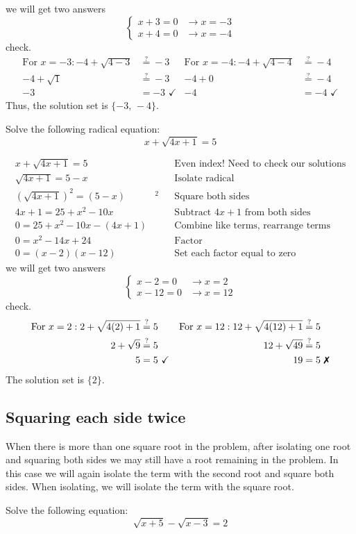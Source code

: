 		we will get two answers
	\[ \begin{cases}
		x+3=0  & \rightarrow x=-3 \\
		x+4=0  & \rightarrow x=-4
	\end{cases} \]
	check.
	\begin{align*}
		\text{For}\,\, x=-3:-4+\sqrt{4-3}&\stackrel{?}{=}-3 & \text{For}\,\, x=-4:-4+\sqrt{4-4}&\stackrel{?}{=}-4\\
		-4+\sqrt{1}&\stackrel{?}{=}-3 & -4+0&\stackrel{?}{=}-4\\
		-3&=-3\,\, \checkmark & -4&=-4\,\,\checkmark
	\end{align*}
Thus, the solution set is $\{-3,\,-4\}$.
\begin{exa}
    Solve the following radical equation: 
    \[
        x+\sqrt{4x+1}=5
    \]
\end{exa}
	\begin{align*}
		x+\sqrt{4x+1}=5& & &\text{Even index! Need to check our solutions}\\
		\sqrt{4x+1}=5-x& & &\text{Isolate radical}\\
		\left(\sqrt{4x+1}\right)^2=(5-x)&^2 & &\text{Square both sides}\\
		4x+1=25+x^2-10x& & &\text{Subtract $4x+1$ from both sides}\\
		0=25+x^2-10x-(4x+1)& & &\text{Combine like terms, rearrange terms}\\
		0=x^2-14x+24& & &\text{Factor}\\
		0=(x-2)(x-12)& & &\text{Set each factor equal to zero}
	\end{align*}
we will get two answers
	\[ \begin{cases}
		x-2=0  & \rightarrow x=2 \\
		x-12=0  & \rightarrow x=12
	\end{cases} \]
	check.
	\begin{align*}
		\text{For}\,\, x=2:2+\sqrt{4(2)+1}&\stackrel{?}{=}5 & \text{For}\,\, x=12:12+\sqrt{4(12)+1}&\stackrel{?}{=}5\\
		2+\sqrt{9}&\stackrel{?}{=}5 & 12+\sqrt{49}&\stackrel{?}{=}5\\
		5&=5\,\, \checkmark & 19&=5\,\, \text{\xmark}
	\end{align*}
The solution set is $\{2\}$.
\subsection{Squaring each side twice}
When there is more than one square root in the problem, after isolating one root and squaring both sides we may still have a root remaining in the problem. In this case we will again isolate the term with the second root and square both sides. When isolating, we will isolate the term with the square root. 
\begin{exa}
    Solve the following equation:
    \[
            \sqrt{x+5}-\sqrt{x-3}=2
    \]
\end{exa}

